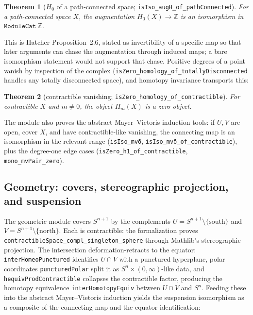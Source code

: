 \documentclass[11pt]{article}
\newtheorem{theorem}{Theorem}[section]
\theoremstyle{remark}
\newcommand{\Z}{\mathbb{Z}}
\newcommand{\leanname}[1]{\texttt{#1}}
\begin{document}
\begin{theorem}[$H_0$ of a path-connected space;
\leanname{isIso\_augH\_of\_pathConnected}]\label{thm:h0}
For a path-connected space $X$, the augmentation
$H_0(X) \to \Z$ is an isomorphism in $\leanname{ModuleCat}\ \Z$.
\end{theorem}

This is Hatcher Proposition~2.6, stated as invertibility of a specific map so
that later arguments can chase the augmentation through induced maps; a bare
isomorphism statement would not support that chase. Positive degrees of a point vanish by
inspection of the complex
(\leanname{isZero\_homology\_of\_totallyDisconnected} handles any totally
disconnected space), and homotopy invariance transports this:

\begin{theorem}[contractible vanishing;
\leanname{isZero\_homology\_of\_contractible}]\label{thm:contractible}
For contractible $X$ and $m \ne 0$, the object $H_m(X)$ is a zero object.
\end{theorem}

The module also proves the abstract Mayer--Vietoris induction tools: if
$U, V$ are open, cover $X$, and have contractible-like vanishing, the
connecting map is an isomorphism in the relevant range
(\leanname{isIso\_mvδ}, \leanname{isIso\_mvδ\_of\_contractible}), plus the
degree-one edge cases (\leanname{isZero\_h1\_of\_contractible},
\leanname{mono\_mvPair\_zero}).

\subsection{Geometry: covers, stereographic projection, and suspension}

The geometric module covers $S^{n+1}$ by the complements
$U = S^{n+1} \setminus \{\text{south}\}$ and
$V = S^{n+1} \setminus \{\text{north}\}$. Each is contractible: the
formalization proves
\leanname{contractibleSpace\_compl\_singleton\_sphere} through Mathlib's
stereographic projection. The intersection deformation-retracts to the
equator: \leanname{interHomeoPunctured} identifies $U \cap V$ with a
punctured hyperplane, polar coordinates \leanname{puncturedPolar} split it
as $S^n \times (0,\infty)$-like data, and
\leanname{hequivProdContractible} collapses the contractible factor,
producing the homotopy equivalence \leanname{interHomotopyEquiv} between
$U \cap V$ and $S^n$. Feeding these into the abstract Mayer--Vietoris
induction yields the suspension isomorphism as a composite of the
connecting map and the equator identification:
\end{document}
